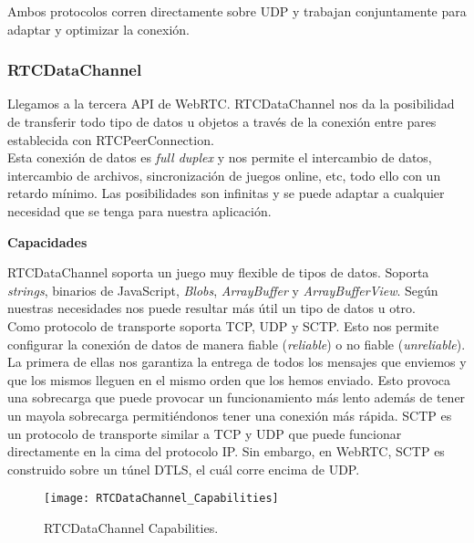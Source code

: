 Ambos protocolos corren directamente sobre UDP y trabajan conjuntamente para adaptar y optimizar la conexión.\\


\subsubsection{RTCDataChannel}

Llegamos a la tercera API de WebRTC. RTCDataChannel nos da la posibilidad de transferir todo tipo de datos u objetos a través de la conexión entre pares establecida con RTCPeerConnection.\\

Esta conexión de datos es \textit{full duplex} y nos permite el intercambio de datos, intercambio de archivos, sincronización de juegos online, etc, todo ello con un retardo mínimo. Las posibilidades son infinitas y se puede adaptar a cualquier necesidad que se tenga para nuestra aplicación.\\

\begin{normalsize}
\noindent \textbf{Capacidades}\\
\end{normalsize}

RTCDataChannel soporta un juego muy flexible de tipos de datos. Soporta \textit{strings}, binarios de JavaScript, \textit{Blobs}, \textit{ArrayBuffer} y \textit{ArrayBufferView}. Según nuestras necesidades nos puede resultar más útil un tipo de datos u otro.\\

Como protocolo de transporte soporta TCP, UDP y SCTP. Esto nos permite configurar la conexión de datos de manera  fiable (\textit{reliable}) o no fiable (\textit{unreliable}). La primera de ellas nos garantiza la entrega de todos los mensajes que enviemos y que los mismos lleguen en el mismo orden que los hemos enviado. Esto provoca una sobrecarga que puede provocar un funcionamiento más lento además de tener un mayola sobrecarga permitiéndonos tener una conexión más rápida. SCTP es un protocolo de transporte similar a TCP y UDP que puede funcionar directamente en la cima del protocolo IP. Sin embargo, en WebRTC, SCTP es construido sobre un túnel DTLS, el cuál corre encima de UDP.

\begin{figure}[htb]
\centering
\texttt{[image: RTCDataChannel\_Capabilities]}
\caption{RTCDataChannel Capabilities.}
\label{fig:datachannel_capabilities}
\end{figure}

